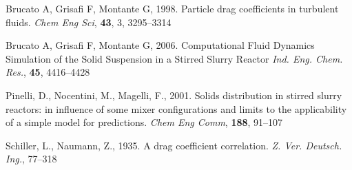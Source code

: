 \begin{thebibliography}{99}

 Brucato A, Grisafi F, Montante G, 1998. Particle drag coefficients in turbulent fluids. \textit{Chem Eng Sci}, \textbf{43}, 3, 3295--3314


 Brucato A, Grisafi F, Montante G, 2006. Computational Fluid Dynamics Simulation of the Solid Suspension in a Stirred Slurry Reactor \textit{Ind. Eng. Chem. Res.}, \textbf{45}, 4416--4428


 Pinelli, D., Nocentini, M., Magelli, F., 2001. Solids distribution in stirred slurry reactors: in influence of some mixer configurations and limits to the applicability of a simple model for predictions.
\textit{Chem Eng Comm}, \textbf{188}, 91--107

 Schiller, L., Naumann, Z., 1935. A drag coefficient correlation. \textit{Z. Ver. Deutsch. Ing.}, 77--318

\end{thebibliography}
